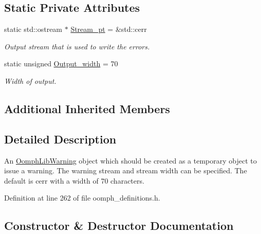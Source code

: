\subsection*{Static Private Attributes}
\begin{DoxyCompactItemize}
\item 
static std\+::ostream $\ast$ \hyperlink{classoomph_1_1OomphLibWarning_a9ef9ec69eb260474537065b7a285717c}{Stream\+\_\+pt} = \&std\+::cerr
\begin{DoxyCompactList}\small\item\em Output stream that is used to write the errors. \end{DoxyCompactList}\item 
static unsigned \hyperlink{classoomph_1_1OomphLibWarning_a9050b8bcb8654198a681483b9c3d5e27}{Output\+\_\+width} = 70
\begin{DoxyCompactList}\small\item\em Width of output. \end{DoxyCompactList}\end{DoxyCompactItemize}
\subsection*{Additional Inherited Members}


\subsection{Detailed Description}
An \hyperlink{classoomph_1_1OomphLibWarning}{Oomph\+Lib\+Warning} object which should be created as a temporary object to issue a warning. The warning stream and stream width can be specified. The default is cerr with a width of 70 characters. 

Definition at line 262 of file oomph\+\_\+definitions.\+h.



\subsection{Constructor \& Destructor Documentation}
\mbox{\label{classoomph_1_1OomphLibWarning_ae85fe4479e40f450a797074549c09ed8}} 
